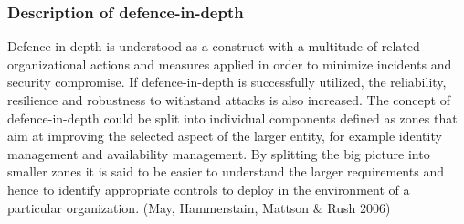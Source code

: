 \documentclass{article}
\begin{document}
\subsubsection{Description of defence-in-depth}
Defence-in-depth is understood as a construct with a multitude of related organizational actions and measures applied in order to minimize incidents and security compromise. If defence-in-depth is successfully utilized, the reliability, resilience and robustness to withstand attacks is also increased. The concept of defence-in-depth could be split into individual components defined as zones that aim at improving the selected aspect of the larger entity, for example identity management and availability management. By splitting the big picture into smaller zones it is said to be easier to understand the larger requirements and hence to identify appropriate controls to deploy in the environment of a particular organization. (May, Hammerstain, Mattson \& Rush 2006)
\end{document}
